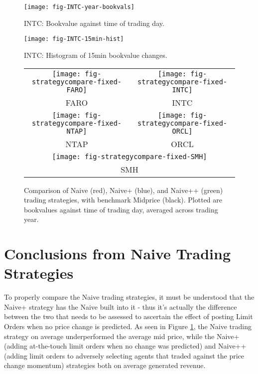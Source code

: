 \documentclass[12pt]{article}
\begin{document}
\begin{figure}
  \texttt{[image: fig-INTC-year-bookvals]}
  \caption{INTC: Bookvalue against time of trading day.}
\end{figure}

\begin{figure}
  \texttt{[image: fig-INTC-15min-hist]} \\
  \caption{INTC: Histogram of 15min bookvalue changes.}
\end{figure}

\begin{figure}[h]
  \centering
  \begin{tabular}{cc}
  	\texttt{[image: fig-strategycompare-fixed-FARO]} & \texttt{[image: fig-strategycompare-fixed-INTC]} \\
  	FARO & INTC \\
  	\texttt{[image: fig-strategycompare-fixed-NTAP]} & \texttt{[image: fig-strategycompare-fixed-ORCL]} \\
  	  	NTAP & ORCL \\
    \multicolumn{2}{c}{\texttt{[image: fig-strategycompare-fixed-SMH]} }\\
    \multicolumn{2}{c}{SMH}  	
  \end{tabular}
  \caption{Comparison of Naive (red), Naive+ (blue), and Naive++ (green) trading strategies, with benchmark Midprice (black). Plotted are bookvalues against time of trading day, averaged across trading year.}
  \label{fig:comp}
\end{figure}

\section*{Conclusions from Naive Trading Strategies}

To properly compare the Naive trading strategies, it must be understood that the Naive+ strategy has the Naive built into it - thus it's actually the difference between the two that needs to be assessed to ascertain the effect of posting Limit Orders when no price change is predicted. As seen in Figure \ref{fig:comp}, the Naive trading strategy on average underperformed the average mid price, while the Naive+ (adding at-the-touch limit orders when no change was predicted) and Naive++ (adding limit orders to adversely selecting agents that traded against the price change momentum) strategies both on average generated revenue. 
\end{document}
